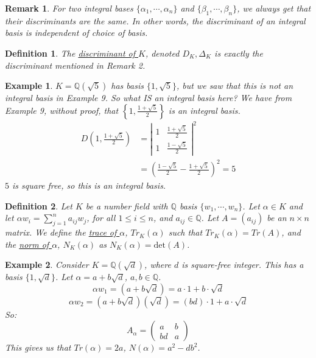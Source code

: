 \documentclass{article}
\newcommand{\Q}{\mathbb{Q}}
\newtheorem{remark}{Remark}
\newtheorem{example}{Example}
\newtheorem{definition}{Definition}
\begin{document}
\begin{remark}
For two integral bases $\{\alpha_1,\cdots,\alpha_n\}$ and $\{\beta_1,\cdots,\beta_n\}$, we always get that their discriminants are the same. In other words, the discriminant of an integral basis is independent of choice of basis. 
\end{remark}
\begin{definition}
The \underline{discriminant of $K$}, denoted $D_K,\Delta_K$ is exactly the discriminant mentioned in Remark 2.
\end{definition}
\begin{example}
$K=\Q(\sqrt{5})$ has basis $\{1,\sqrt{5}\}$, but we saw that this is not an integral basis in Example 9. So what IS an integral basis here? We have from Example 9, without proof, that $\left\{1,\frac{1+\sqrt{5}}{2}\right\}$ is an integral basis.
\begin{align*}
    D\left(1,\frac{1+\sqrt{5}}{2}\right)&=\left|\begin{array}{cc}
        1 & \frac{1+\sqrt{5}}{2} \\
        1 & \frac{1-\sqrt{5}}{2}
    \end{array}\right|^2\\
    &=\left(\frac{1-\sqrt{5}}{2}-\frac{1+\sqrt{5}}{2}\right)^2=5
\end{align*}
$5$ is square free, so this is an integral basis.
\end{example}
\begin{definition}
Let $K$ be a number field with $\Q$ basis $\{w_1,\cdots, w_n\}$. Let $\alpha\in K$ and let $\alpha w_i=\displaystyle\sum_{j=1}^na_{ij}w_j$, for all $1\leq i\leq n$, and $a_{ij}\in\Q$. Let $A=(a_{ij})$ be an $n\times n$ matrix.
We define the \underline{trace of $\alpha$}, $Tr_K(\alpha)$ such that $Tr_K(\alpha)=Tr(A)$, and the \underline{norm of $\alpha$}, $N_K(\alpha)$ as $N_K(\alpha)=\text{det}(A)$.
\end{definition}
\begin{example}
Consider $K=\Q(\sqrt{d})$, where $d$ is square-free integer. This has a basis $\{1,\sqrt{d}\}$. Let $\alpha=a+b\sqrt{d}$, $a,b\in\Q$.
$$\alpha w_1=(a+b\sqrt{d})=a\cdot 1 + b\cdot \sqrt{d}$$
$$\alpha w_2=(a+b\sqrt{d})(\sqrt{d})=(bd)\cdot 1 + a\cdot\sqrt{d}$$
So:
$$A_\alpha = \begin{pmatrix}a & b\\ bd & a\end{pmatrix}$$
This gives us that $Tr(\alpha)=2a$, $N(\alpha)=a^2-db^2$.
\end{example}
\newpage
\end{document}
